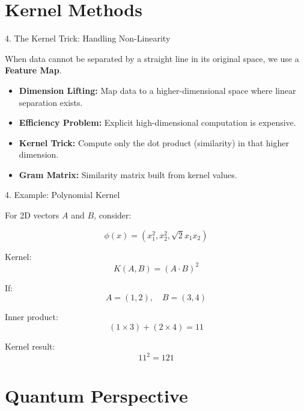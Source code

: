 \documentclass{beamer}
\begin{document}
\section{Kernel Methods}

\begin{frame}{4. The Kernel Trick: Handling Non-Linearity}

When data cannot be separated by a straight line in its original space, we use a \textbf{Feature Map}.

\begin{itemize}
    \item \textbf{Dimension Lifting:}
    Map data to a higher-dimensional space where linear separation exists.
    
    \item \textbf{Efficiency Problem:}
    Explicit high-dimensional computation is expensive.
    
    \item \textbf{Kernel Trick:}
    Compute only the dot product (similarity) in that higher dimension.
    
    \item \textbf{Gram Matrix:}
    Similarity matrix built from kernel values.
\end{itemize}

\end{frame}

\begin{frame}{4. Example: Polynomial Kernel}

For 2D vectors $A$ and $B$, consider:

\[
\phi(x) = (x_1^2, x_2^2, \sqrt{2}x_1x_2)
\]

Kernel:
\[
K(A,B) = (A \cdot B)^2
\]

If:
\[
A = (1,2), \quad B = (3,4)
\]

Inner product:
\[
(1 \times 3) + (2 \times 4) = 11
\]

Kernel result:
\[
11^2 = 121
\]

\end{frame}

\section{Quantum Perspective}
\end{document}
